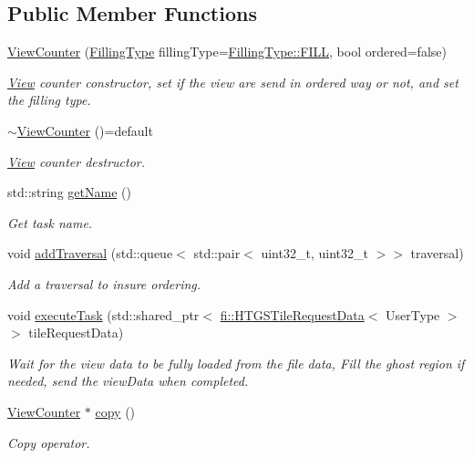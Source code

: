 \subsection*{Public Member Functions}
\begin{DoxyCompactItemize}
\item 
\hyperlink{classfi_1_1ViewCounter_a91de9bc19ea0f0629ebb689ecae07f68}{View\+Counter} (\hyperlink{namespacefi_a6808b618c85d179a330ca388162215bd}{Filling\+Type} filling\+Type=\hyperlink{namespacefi_a6808b618c85d179a330ca388162215bdae8225b11842409df543692aebed34fd1}{Filling\+Type\+::\+F\+I\+LL}, bool ordered=false)
\begin{DoxyCompactList}\small\item\em \hyperlink{classfi_1_1View}{View} counter constructor, set if the view are send in ordered way or not, and set the filling type. \end{DoxyCompactList}\item 
\hyperlink{classfi_1_1ViewCounter_abc86ae6ba64c6be66d512ab6412ce108}{$\sim$\+View\+Counter} ()=default
\begin{DoxyCompactList}\small\item\em \hyperlink{classfi_1_1View}{View} counter destructor. \end{DoxyCompactList}\item 
std\+::string \hyperlink{classfi_1_1ViewCounter_a555dfa42020fa6cc1a710221838b2e1e}{get\+Name} ()
\begin{DoxyCompactList}\small\item\em Get task name. \end{DoxyCompactList}\item 
void \hyperlink{classfi_1_1ViewCounter_ae0c572277d297849a1b2dde6f8e4a521}{add\+Traversal} (std\+::queue$<$ std\+::pair$<$ uint32\+\_\+t, uint32\+\_\+t $>$$>$ traversal)
\begin{DoxyCompactList}\small\item\em Add a traversal to insure ordering. \end{DoxyCompactList}\item 
void \hyperlink{classfi_1_1ViewCounter_a2c05a287109d15c0e33b6855545db65d}{execute\+Task} (std\+::shared\+\_\+ptr$<$ \hyperlink{classfi_1_1HTGSTileRequestData}{fi\+::\+H\+T\+G\+S\+Tile\+Request\+Data}$<$ User\+Type $>$$>$ tile\+Request\+Data)
\begin{DoxyCompactList}\small\item\em Wait for the view data to be fully loaded from the file data, Fill the ghost region if needed, send the view\+Data when completed. \end{DoxyCompactList}\item 
\hyperlink{classfi_1_1ViewCounter}{View\+Counter} $\ast$ \hyperlink{classfi_1_1ViewCounter_a78ffe68387ffe83ce2135c9cd5cac033}{copy} ()
\begin{DoxyCompactList}\small\item\em Copy operator. \end{DoxyCompactList}\end{DoxyCompactItemize}
